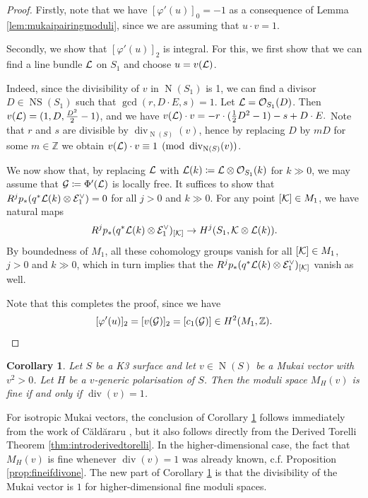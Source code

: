 \documentclass[11pt,twoside]{amsart}
\numberwithin{equation}{section}
\newtheorem{corollary}[dummy]{Corollary}
\theoremstyle{definition}
\theoremstyle{plain}
\newcommand{\Z}{\ensuremath{\mathbb{Z}}}
\newcommand{\bigo}{\ensuremath{\mathcal{O}}}
\def\NS{\operatorname{NS}}
\def\N{\operatorname{N}}
\def\dv{\operatorname{div}}
\begin{document}
\begin{proof}
Firstly, note that we have $[\varphi'(u)]_0=-1$ as a consequence of Lemma \ref{lem:mukaipairingmoduli}, since we are assuming that $u\cdot v=1$. 

Secondly, we show that $[\varphi'(u)]_2$ is integral. For this, we first show that we can find a line bundle $\mathcal{L}$ on $S_1$ and choose $u=v(\mathcal{L})$. 

Indeed, since the divisibility of $v$ in $\operatorname{N}(S_1)$ is 1, we can find a divisor $D\in \NS(S_1)$ such that $\operatorname{gcd}(r,D\cdot E,s)=1$. Let $\calL = \bigo_{S_1}(D)$. Then $v(\mathcal{L}) = (1,D,\frac{D^2}{2}-1)$, and we have $v(\mathcal{L})\cdot v = -r\cdot (\frac{1}{2}D^2 - 1) - s + D\cdot E.$ Note that $r$ and $s$ are divisible by $\dv_{\N(S)}(v)$, hence by replacing $D$ by $mD$ for some $m\in \Z$ we obtain $v(\calL)\cdot v\equiv 1\pmod{\dv_{\N(S)}(v)}$.


We now show that, by replacing $\mathcal{L}$ with $\calL(k)\coloneqq \calL\otimes \bigo_{S_1}(k)$ for $k\gg 0$, we may assume that $\mathcal{G}\coloneqq \Phi'(\mathcal{L})$ is locally free. It suffices to show that $R^jp_*(q^*\mathcal{L}(k)\otimes \mathcal{E}^\vee_1)=0$ for all $j>0$ and $k\gg0$. For any point $[\mathcal{K}] \in M_1$, we have natural maps $$R^jp_*(q^*\mathcal{L}(k)\otimes \mathcal{E}^\vee_1)_{[\mathcal{K}]} \to H^j(S_1,\mathcal{K}\otimes \mathcal{L}(k)).$$ 
By boundedness of $M_1$, all these cohomology groups vanish  for all $[\mathcal{K}]\in M_1$, $j>0$ and $k\gg 0$, which in turn implies that the $R^jp_*(q^*\mathcal{L}(k)\otimes \mathcal{E}^\vee_1)_{[\mathcal{K}]}$ vanish as well.

Note that this completes the proof, since we have $$[\varphi'(u)]_2=[v(\mathcal{G})]_2=[c_1(\mathcal{G})]\in H^2(M_1,\mathbb{Z}).$$
\end{proof}

\begin{corollary}\label{cor:fineiffdivone}
   Let $S$ be a K3 surface and let $v\in \operatorname{N}(S)$ be a Mukai vector with $v^2 >0$. Let $H$ be a $v$-generic polarisation of $S$. Then the moduli space $M_H(v)$ is fine if and only if $\operatorname{div}(v)=1$.
\end{corollary}
For isotropic Mukai vectors, the conclusion of Corollary \ref{cor:fineiffdivone} follows immediately from the work of C\u ald\u araru \cite{Cal00}, but it also follows directly from the Derived Torelli Theorem \ref{thm:introderivedtorelli}. In the higher-dimensional case, the fact that $M_H(v)$ is fine whenever $\operatorname{div}(v)=1$ was already known, c.f. Proposition \ref{prop:fineifdivone}. The new part of Corollary \ref{cor:fineiffdivone} is that the divisibility of the Mukai vector is $1$ for higher-dimensional fine moduli spaces.
\end{document}
